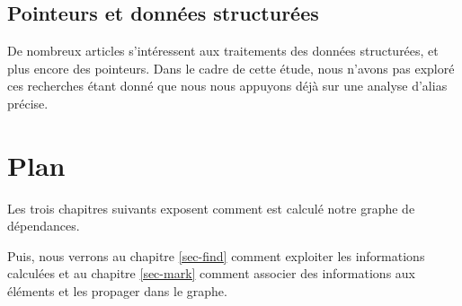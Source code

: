 \subsection{Pointeurs et données structurées}

De nombreux articles s'intéressent aux traitements des données structurées,
et plus encore des pointeurs. Dans le cadre de cette étude,
nous n'avons pas exploré ces recherches étant donné que
nous nous appuyons déjà sur une analyse d'alias précise.


\section{Plan}

Les trois chapitres suivants
exposent comment est calculé notre graphe de dépendances.

Puis, nous verrons au chapitre \ref{sec-find} comment
exploiter les informations calculées et au chapitre
\ref{sec-mark} comment associer des informations aux éléments
et les propager dans le graphe.


